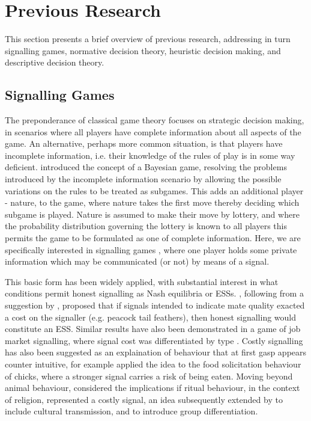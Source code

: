 \section{Previous Research}

\label{sec:lit_review}

This section presents a brief overview of previous research, addressing in turn signalling games, normative decision theory, heuristic decision making, and descriptive decision theory.


\subsection{Signalling Games}

The preponderance of classical game theory focuses on strategic decision making, in scenarios where all players have complete information about all aspects of the game. An alternative, perhaps more common situation, is that players have incomplete information, i.e. their knowledge of the rules of play is in some way deficient. \citet{Harsanyi1967} introduced the concept of a Bayesian game, resolving the problems introduced by the incomplete information scenario by allowing the possible variations on the rules to be treated as subgames. This adds an additional player - nature, to the game, where nature takes the first move thereby deciding which subgame is played. Nature is assumed to make their move by lottery, and where the probability distribution governing the lottery is known to all players this permits the game to be formulated as one of complete information. Here, we are specifically interested in signalling games \citep{Kreps1987,Spence1973}, where one player holds some private information which may be communicated (or not) by means of a signal.

This basic form has been widely applied, with substantial interest in what conditions permit honest signalling as Nash equilibria or \acp{ESS}. \citet{Grafen1990}, following from a suggestion by \citet{Zahavi1975}, proposed that if signals intended to indicate mate quality exacted a cost on the signaller (e.g. peacock tail feathers), then honest signalling would constitute an \ac{ESS}. Similar results have also been demonstrated in a game of job market signalling, where signal cost was differentiated by type \citep{Spence1973}. 
Costly signalling has also been suggested as an explaination of behaviour that at first gasp appears counter intuitive, for example \citet{Godfray1991} applied the idea to the food solicitation behaviour of chicks, where a stronger signal carries a risk of being eaten. Moving beyond animal behaviour, \citet{Sosis2003} considered the implications if ritual behaviour, in the context of religion, represented a costly signal, an idea subsequently extended by \citet{Henrich2009} to include cultural transmission, and \citet{Wildman2011} to introduce group differentiation.

